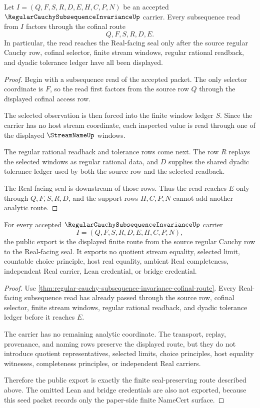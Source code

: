\begin{theorem}
\label{thm:regular-cauchy-subsequence-invariance-cofinal-route}
Let $I=(Q,F,S,R,D,E,H,C,P,N)$ be an accepted $\RegularCauchySubsequenceInvarianceUp$ carrier. Every subsequence read from $I$ factors through the cofinal route
$$
Q,F,S,R,D,E.
$$
In particular, the read reaches the Real-facing seal only after the source regular Cauchy row, cofinal selector, finite stream windows, regular rational readback, and dyadic tolerance ledger have all been displayed.
\end{theorem}
\begin{proof}
Begin with a subsequence read of the accepted packet. The only selector coordinate is $F$, so the read first factors from the source row $Q$ through the displayed cofinal access row.

The selected observation is then forced into the finite window ledger $S$. Since the carrier has no host stream coordinate, each inspected value is read through one of the displayed $\StreamNameUp$ windows.

The regular rational readback and tolerance rows come next. The row $R$ replays the selected windows as regular rational data, and $D$ supplies the shared dyadic tolerance ledger used by both the source row and the selected readback.

The Real-facing seal is downstream of those rows. Thus the read reaches $E$ only through $Q,F,S,R,D$, and the support rows $H,C,P,N$ cannot add another analytic route.
\end{proof}

\begin{theorem}
\label{thm:regular-cauchy-subsequence-invariance-real-seal-nonescape}
For every accepted $\RegularCauchySubsequenceInvarianceUp$ carrier
$$
I=(Q,F,S,R,D,E,H,C,P,N),
$$
the public export is the displayed finite route from the source regular Cauchy row to the Real-facing seal. It exports no quotient stream equality, selected limit, countable choice principle, host real equality, ambient Real completeness, independent Real carrier, Lean credential, or bridge credential.
\end{theorem}
\begin{proof}
Use \autoref{thm:regular-cauchy-subsequence-invariance-cofinal-route}. Every Real-facing subsequence read has already passed through the source row, cofinal selector, finite stream windows, regular rational readback, and dyadic tolerance ledger before it reaches $E$.

The carrier has no remaining analytic coordinate. The transport, replay, provenance, and naming rows preserve the displayed route, but they do not introduce quotient representatives, selected limits, choice principles, host equality witnesses, completeness principles, or independent Real carriers.

Therefore the public export is exactly the finite seal-preserving route described above. The omitted Lean and bridge credentials are also not exported, because this seed packet records only the paper-side finite NameCert surface.
\end{proof}

